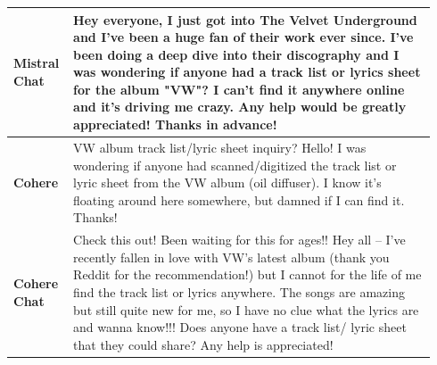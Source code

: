 \documentclass[11pt]{article}
\begin{document}
\begin{table}
\begin{tabular}{p{0.11\linewidth}|p{0.83\linewidth}}
\midrule
\textbf{Mistral Chat}&Hey everyone, I just got into The Velvet Underground and I've been a huge fan of their work ever since. I've been doing a deep dive into their discography and I was wondering if anyone had a track list or lyrics sheet for the album "VW"? I can't find it anywhere online and it's driving me crazy. Any help would be greatly appreciated! Thanks in advance!\\
\midrule
\textbf{Cohere}&VW album track list/lyric sheet inquiry? Hello! I was wondering if anyone had scanned/digitized the track list or lyric sheet from the VW album (oil diffuser). I know it's floating around here somewhere, but damned if I can find it. Thanks!\\
\midrule
\textbf{Cohere Chat}&Check this out! Been waiting for this for ages!! Hey all – I've recently fallen in love with VW's latest album (thank you Reddit for the recommendation!) but I cannot for the life of me find the track list or lyrics anywhere. The songs are amazing but still quite new for me, so I have no clue what the lyrics are and wanna know!!! Does anyone have a track list/ lyric sheet that they could share? Any help is appreciated!\\
\midrule
\end{tabular}
\end{table}
\end{document}
